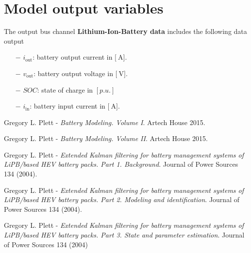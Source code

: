 \documentclass[11pt,a4paper]{article}
\numberwithin{equation}{section}
\theoremstyle{it}
\theoremstyle{definition}
\begin{document}
\section{Model output variables}
The output bus channel \textbf{Lithium-Ion-Battery data} includes the following data output
\begin{itemize}
	\item[$-$] $i_\text{out}$: battery output current in $\Big[\SI{}{\ampere}\Big]$.
	\item[$-$] $v_\text{out}$: battery output voltage in $\Big[\SI{}{\volt}\Big]$.  
	\item[$-$] $SOC$: state of charge in $[p.u.]$
	\item[$-$] $i_\text{in}$: battery input current in $\Big[\SI{}{\ampere}\Big]$.
\end{itemize}
\begin{thebibliography}{99}

	 Gregory L. Plett - \textit{Battery Modeling. Volume I}. Artech House 2015.
	
	 Gregory L. Plett - \textit{Battery Modeling. Volume II}. Artech House 2015.
	
	 Gregory L. Plett - \textit{Extended Kalman filtering for battery management systems of LiPB/based HEV battery packs. Part 1. Background}. Journal of Power Sources 134 (2004).
	
	 Gregory L. Plett - \textit{Extended Kalman filtering for battery management systems of LiPB/based HEV battery packs. Part 2. Modeling and identification}. Journal of Power Sources 134 (2004).	
	
	 Gregory L. Plett - \textit{Extended Kalman filtering for battery management systems of LiPB/based HEV battery packs. Part 3. State and parameter estimation}. Journal of Power Sources 134 (2004)
	
\end{thebibliography}
\end{document}
